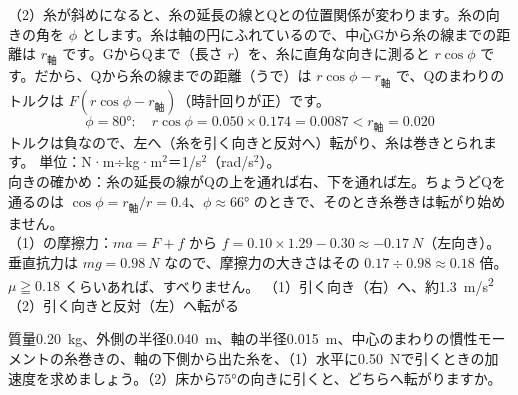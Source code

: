 \begin{phreidai}
（2）糸が斜めになると、糸の延長の線とQとの位置関係が変わります。糸の向きの角を $\phi$ とします。糸は軸の円にふれているので、中心Gから糸の線までの距離は $r_{\text{軸}}$ です。GからQまで（長さ $r$）を、糸に直角な向きに測ると $r\cos\phi$ です。だから、Qから糸の線までの距離（うで）は $r\cos\phi-r_{\text{軸}}$ で、Qのまわりのトルクは $F(r\cos\phi-r_{\text{軸}})$（時計回りが正）です。
\[\phi=\ang{80}:\quad r\cos\phi=0.050\times0.174=0.0087<r_{\text{軸}}=0.020\]
トルクは負なので、左へ（糸を引く向きと反対へ）転がり、糸は巻きとられます。
\phtashikame
単位：N·m÷kg·m$^2$＝1/s$^2$（rad/s$^2$）。\\
向きの確かめ：糸の延長の線がQの上を通れば右、下を通れば左。ちょうどQを通るのは $\cos\phi=r_{\text{軸}}/r=0.4$、$\phi\approx\ang{66}$ のときで、そのとき糸巻きは転がり始めません。\\
（1）の摩擦力：$ma=F+f$ から $f=0.10\times1.29-0.30\approx\qty{-0.17}{N}$（左向き）。垂直抗力は $mg=\qty{0.98}{N}$ なので、摩擦力の大きさはその $0.17\div0.98\approx0.18$ 倍。$\mu\geqq0.18$ くらいあれば、すべりません。
\kotae （1）引く向き（右）へ、約\qty{1.3}{m/s^2}\quad（2）引く向きと反対（左）へ転がる
\end{phreidai}
\begin{jibun}
質量\qty{0.20}{kg}、外側の半径\qty{0.040}{m}、軸の半径\qty{0.015}{m}、中心のまわりの慣性モーメントの糸巻きの、軸の下側から出た糸を、（1）水平に\qty{0.50}{N}で引くときの加速度を求めましょう。（2）床から\ang{75}の向きに引くと、どちらへ転がりますか。
\end{jibun}

